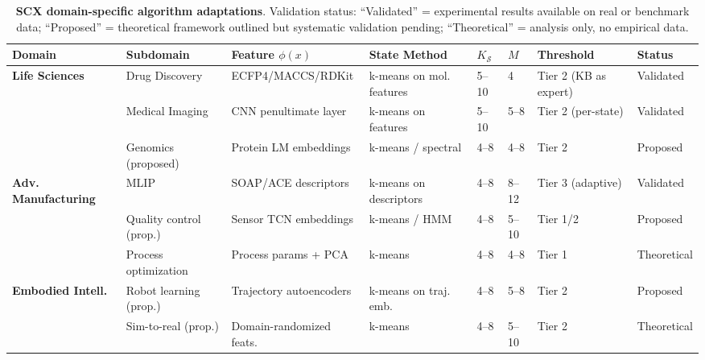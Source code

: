 \documentclass{article}
\begin{document}
\begin{table}[ht]
\caption{\textbf{SCX domain-specific algorithm adaptations}. Validation status: ``Validated'' = experimental results available on real or benchmark data; ``Proposed'' = theoretical framework outlined but systematic validation pending; ``Theoretical'' = analysis only, no empirical data.}
\label{tab:adaptations}
\centering
\small
\begin{tabular}{llllllll}
\toprule
\textbf{Domain} & \textbf{Subdomain} & \textbf{Feature $\phi(x)$} & \textbf{State Method} & $K_{\mathcal{S}}$ & $M$ & \textbf{Threshold} & \textbf{Status} \\
\midrule
\textbf{Life Sciences} & Drug Discovery & ECFP4/MACCS/RDKit & k-means on mol. features & 5--10 & 4 & Tier 2 (KB as expert) & Validated \\
 & Medical Imaging & CNN penultimate layer & k-means on features & 5--10 & 5--8 & Tier 2 (per-state) & Validated \\
 & Genomics (proposed) & Protein LM embeddings & k-means / spectral & 4--8 & 4--8 & Tier 2 & Proposed \\
\midrule
\textbf{Adv. Manufacturing} & MLIP & SOAP/ACE descriptors & k-means on descriptors & 4--8 & 8--12 & Tier 3 (adaptive) & Validated \\
 & Quality control (prop.) & Sensor TCN embeddings & k-means / HMM & 4--8 & 5--10 & Tier 1/2 & Proposed \\
 & Process optimization & Process params + PCA & k-means & 4--8 & 4--8 & Tier 1 & Theoretical \\
\midrule
\textbf{Embodied Intell.} & Robot learning (prop.) & Trajectory autoencoders & k-means on traj. emb. & 4--8 & 5--8 & Tier 2 & Proposed \\
 & Sim-to-real (prop.) & Domain-randomized feats. & k-means & 4--8 & 5--10 & Tier 2 & Theoretical \\
\bottomrule
\end{tabular}
\end{table}
\end{document}
